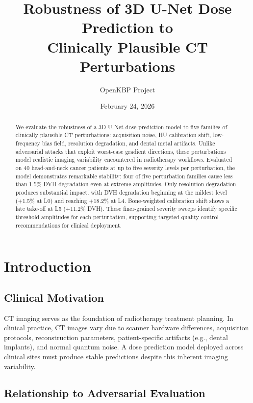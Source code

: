 \documentclass[11pt,a4paper]{article}
\title{Robustness of 3D U-Net Dose Prediction to\\Clinically Plausible CT Perturbations}
\author{OpenKBP Project}
\date{February 24, 2026}
\begin{document}
\maketitle

\begin{abstract}
We evaluate the robustness of a 3D U-Net dose prediction model to five families of clinically plausible CT perturbations: acquisition noise, HU calibration shift, low-frequency bias field, resolution degradation, and dental metal artifacts. Unlike adversarial attacks that exploit worst-case gradient directions, these perturbations model realistic imaging variability encountered in radiotherapy workflows. Evaluated on 40 head-and-neck cancer patients at up to five severity levels per perturbation, the model demonstrates remarkable stability: four of five perturbation families cause less than 1.5\% DVH degradation even at extreme amplitudes. Only resolution degradation produces substantial impact, with DVH degradation beginning at the mildest level (+1.5\% at L0) and reaching +18.2\% at L4. Bone-weighted calibration shift shows a late take-off at L5 (+11.2\% DVH). These finer-grained severity sweeps identify specific threshold amplitudes for each perturbation, supporting targeted quality control recommendations for clinical deployment.
\end{abstract}

\tableofcontents
\newpage

\section{Introduction}

\subsection{Clinical Motivation}

CT imaging serves as the foundation of radiotherapy treatment planning. In clinical practice, CT images vary due to scanner hardware differences, acquisition protocols, reconstruction parameters, patient-specific artifacts (e.g., dental implants), and normal quantum noise. A dose prediction model deployed across clinical sites must produce stable predictions despite this inherent imaging variability.

\subsection{Relationship to Adversarial Evaluation}
\end{document}
